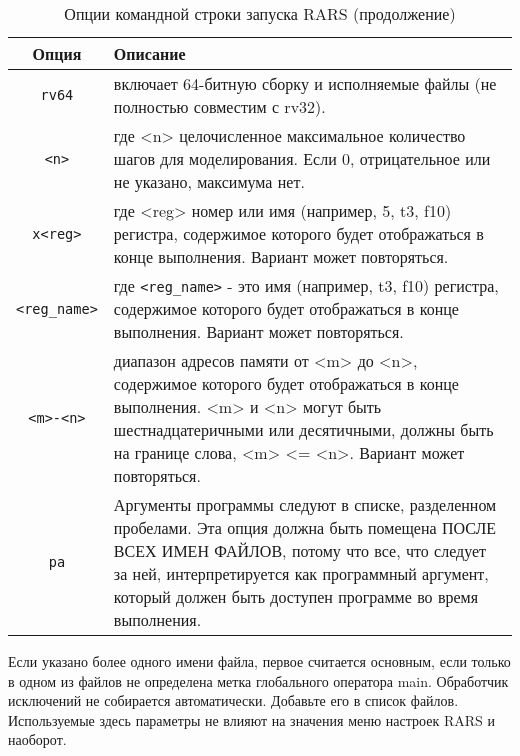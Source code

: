 \begin{table}[h]
    \caption{Опции командной строки запуска RARS (продолжение)}
    \centering
    \begin{tabularx}{\textwidth}{|c|X|}
        \hline
        \textbf{Опция} & \textbf{Описание} \\
        \hline \hline
        \texttt{rv64} & включает 64-битную сборку и исполняемые файлы (не полностью совместим с rv32). \\
        \hline
        \texttt{<n>} & где <n> целочисленное максимальное количество шагов для моделирования. Если 0, отрицательное или не указано, максимума нет. \\
        \hline
        \texttt{x<reg>} & где <reg> номер или имя (например, 5, t3, f10) регистра, содержимое которого будет отображаться в конце выполнения. Вариант может повторяться. \\
        \hline
        \verb|<reg_name>| & где \verb|<reg_name>| - это имя (например, t3, f10) регистра, содержимое которого будет отображаться в конце выполнения. Вариант может повторяться. \\
        \hline
        \texttt{<m>-<n>} & диапазон адресов памяти от <m> до <n>, содержимое которого будет отображаться в конце выполнения. <m> и <n> могут быть шестнадцатеричными или десятичными, должны быть на границе слова, <m> <= <n>. Вариант может повторяться. \\
        \hline
        \texttt{pa} & Аргументы программы следуют в списке, разделенном пробелами. Эта опция должна быть помещена ПОСЛЕ ВСЕХ ИМЕН ФАЙЛОВ, потому что все, что следует за ней, интерпретируется как программный аргумент, который должен быть доступен программе во время выполнения. \\
        \hline
    \end{tabularx}
    \label{table-option2}
\end{table}

Если указано более одного имени файла, первое считается основным, если только в одном из файлов не определена метка глобального оператора main. Обработчик исключений не собирается автоматически. Добавьте его в список файлов. Используемые здесь параметры не влияют на значения меню настроек RARS и наоборот.

